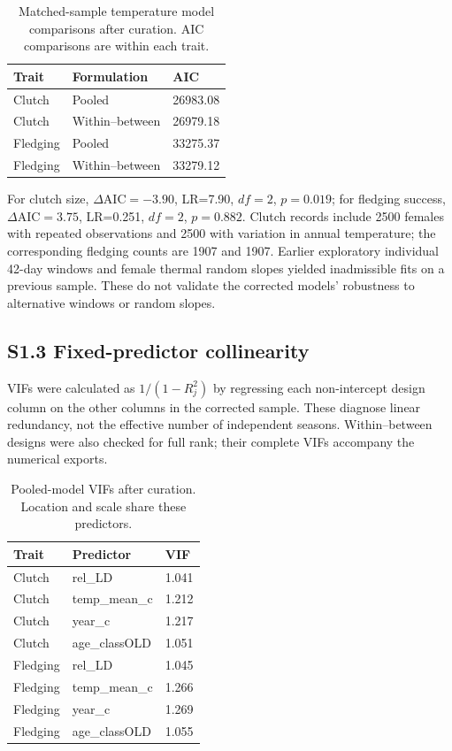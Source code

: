 \documentclass{article}
\begin{document}
\begin{table}[!ht]\centering\scriptsize\singlespacing
\caption{Matched-sample temperature model comparisons after curation. AIC comparisons are within each trait.}\label{tab:temperature-model-comparison}
\begin{tabular}{lll}\toprule
Trait & Formulation & AIC\\\midrule
Clutch & Pooled & 26983.08\\
Clutch & Within--between & 26979.18\\
Fledging & Pooled & 33275.37\\
Fledging & Within--between & 33279.12\\
\bottomrule\end{tabular}\end{table}
For clutch size, $\Delta\mathrm{AIC}=-3.90$, LR=7.90, $df=2$, $p=0.019$; for fledging success, $\Delta\mathrm{AIC}=3.75$, LR=0.251, $df=2$, $p=0.882$. Clutch records include 2500 females with repeated observations and 2500 with variation in annual temperature; the corresponding fledging counts are 1907 and 1907. Earlier exploratory individual 42-day windows and female thermal random slopes yielded inadmissible fits on a previous sample. These do not validate the corrected models' robustness to alternative windows or random slopes.

\subsection{S1.3 Fixed-predictor collinearity}

VIFs were calculated as $1/(1-R_j^2)$ by regressing each non-intercept design column on the other columns in the corrected sample. These diagnose linear redundancy, not the effective number of independent seasons. Within--between designs were also checked for full rank; their complete VIFs accompany the numerical exports.

\begin{table}[!ht]\centering\scriptsize\singlespacing
\caption{Pooled-model VIFs after curation. Location and scale share these predictors.}\label{tab:revised-vif}
\begin{tabular}{lll}\toprule
Trait & Predictor & VIF\\\midrule
Clutch & rel\_LD & 1.041\\
Clutch & temp\_mean\_c & 1.212\\
Clutch & year\_c & 1.217\\
Clutch & age\_classOLD & 1.051\\
Fledging & rel\_LD & 1.045\\
Fledging & temp\_mean\_c & 1.266\\
Fledging & year\_c & 1.269\\
Fledging & age\_classOLD & 1.055\\
\bottomrule\end{tabular}\end{table}
\end{document}
